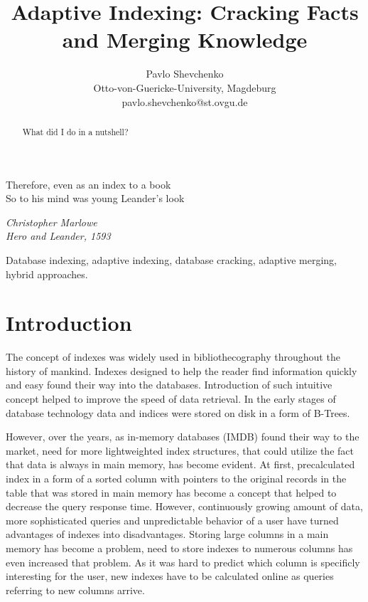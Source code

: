\documentclass[10pt, conference, compsocconf]{IEEEtran}
\begin{document}
\title{Adaptive Indexing: Cracking Facts and Merging Knowledge}
\author{Pavlo Shevchenko \\ Otto-von-Guericke-University, Magdeburg \\ pavlo.shevchenko@st.ovgu.de}

\maketitle

\epigraph{Therefore, even as an index to a book \\
So to his mind was young Leander's look}{\textit{Christopher Marlowe\\Hero and Leander, 1593}}

\begin{abstract}
What did I do in a nutshell?\\
\end{abstract}

\begin{IEEEkeywords}
Database indexing, adaptive indexing, database cracking, adaptive merging, hybrid approaches.
\end{IEEEkeywords}

\section{Introduction}
The concept of indexes was widely used in bibliothecography throughout the history of mankind. %
Indexes designed to help the reader find information quickly and easy found their way into the databases. Introduction of such intuitive concept helped to improve the speed of data retrieval. In the early stages of database technology data and indices were stored on disk in a form of B-Trees.

However, over the years, as in-memory databases (IMDB) found their way to the market, need for more lightweighted index structures, that could utilize the fact that data is always in main memory, has become evident. At first, precalculated index in a form of a sorted column with pointers to the original records in the table that was stored in main memory has become a concept that helped to decrease the query response time. However, continuously growing amount of data, more sophisticated queries and unpredictable behavior of a user have turned advantages of indexes into disadvantages. Storing large columns in a main memory has become a problem, need to store indexes to numerous columns has even increased that problem. As it was hard to predict which column is specificly interesting for the user, new indexes have to be calculated online as queries referring to new columns arrive.
\end{document}
